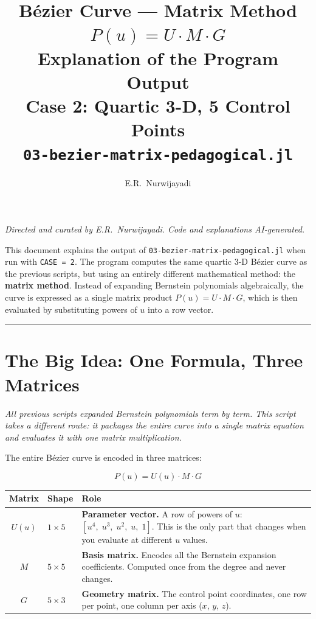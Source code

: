 \documentclass[12pt, a4paper]{article}
\title{%
  \vspace{1cm}
  {\LARGE\bfseries B\'ezier Curve --- Matrix Method}\\[0.4em]
  {\large $P(u) = U \cdot M \cdot G$}\\[0.4em]
  {\large Explanation of the Program Output}\\[0.4em]
  {\normalsize Case 2: Quartic 3-D, 5 Control Points}\\[0.4em]
  {\normalsize\texttt{03-bezier-matrix-pedagogical.jl}}
}
\author{E.R.\ Nurwijayadi}
\date{\DTMtoday}
\newcommand{\cd}[1]{\texttt{#1}}
\begin{document}

\maketitle
\thispagestyle{empty}

\begin{center}
\textit{Directed and curated by E.R.\ Nurwijayadi.
Code and explanations AI-generated.}
\end{center}

\begin{center}
\begin{minipage}{0.85\textwidth}
\small
This document explains the output of
\cd{03-bezier-matrix-pedagogical.jl} when run with \cd{CASE = 2}.
The program computes the same quartic 3-D B\'ezier curve
as the previous scripts, but using an entirely different
mathematical method: the \textbf{matrix method}.
Instead of expanding Bernstein polynomials algebraically,
the curve is expressed as a single matrix product
$P(u) = U \cdot M \cdot G$, which is then evaluated
by substituting powers of $u$ into a row vector.
\end{minipage}
\end{center}

\vspace{1em}\hrule\vspace{1.5em}
\tableofcontents
\newpage


\section{The Big Idea: One Formula, Three Matrices}

\textit{All previous scripts expanded Bernstein polynomials
term by term.
This script takes a different route:
it packages the entire curve into a single matrix equation
and evaluates it with one matrix multiplication.}

The entire B\'ezier curve is encoded in three matrices:

\[
  P(u) = U(u) \cdot M \cdot G
\]

\begin{center}
\begin{tabular}{clp{7cm}}
\toprule
Matrix & Shape & Role \\
\midrule
$U(u)$ & $1 \times 5$ &
  \textbf{Parameter vector.}
  A row of powers of $u$: $[u^4,\; u^3,\; u^2,\; u,\; 1]$.
  This is the only part that changes when you evaluate at
  different $u$ values. \\[6pt]
$M$ & $5 \times 5$ &
  \textbf{Basis matrix.}
  Encodes all the Bernstein expansion coefficients.
  Computed once from the degree and never changes. \\[6pt]
$G$ & $5 \times 3$ &
  \textbf{Geometry matrix.}
  The control point coordinates, one row per point,
  one column per axis ($x$, $y$, $z$). \\
\bottomrule
\end{tabular}
\end{center}
\end{document}

